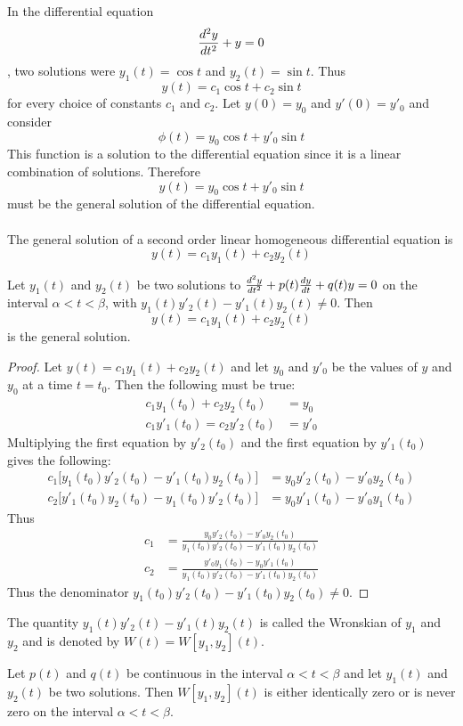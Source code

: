 \documentclass[12pt]{article}
\begin{document}
In the differential equation $$\frac{d^2y}{dt^2} + y = 0$$, two solutions were $y_1(t) = \cos t$ and $y_2(t) = \sin t$. Thus $$y(t) = c_1\cos t + c_2 \sin t $$ for every choice of constants $c_1$ and $c_2$. Let $y(0)= y_0$ and $y'(0) = y'_0$ and consider $$\phi(t) = y_0\cos t + y'_0 \sin t $$ This function is a solution to the differential equation since it is a linear combination of solutions. Therefore $$y(t) = y_0 \cos t + y'_0 \sin t $$ must be the general solution of the differential equation. \\~\\
The general solution of a second order linear homogeneous differential equation is $$ y(t) = c_1y_1(t) + c_2y_2(t) $$ 
\begin{theorem} Let $y_1(t)$ and $y_2(t)$ be two solutions to $\frac{d^2y}{dt^2} + p(t)\frac{dy}{dt} + q(t)y = 0$ on the interval $\alpha < t < \beta$, with $y_1(t)y'_2(t) - y'_1(t)y_2(t) \neq 0$. Then $$y(t) = c_1y_1(t) + c_2y_2(t)$$ is the general solution. \end{theorem} 
\begin{proof} Let $y(t) = c_1y_1(t) + c_2y_2(t)$ and let $y_0$ and $y'_0$ be the values of $y$ and $y_0$ at a time $t = t_0$. Then the following must be true: $$\begin{aligned} c_1y_1(t_0) + c_2y_2(t_0) &= y_0 \\ c_1y'_1(t_0) = c_2y'_2(t_0) &= y'_0 \end{aligned} $$ Multiplying the first equation by $y'_2(t_0)$ and the first equation by $y'_1(t_0)$ gives the following: $$\begin{aligned} c_1\Big[y_1(t_0)y'_2(t_0) - y'_1(t_0)y_2(t_0)\Big] &= y_0y'_2(t_0) - y'_0y_2(t_0) \\ c_2\Big[y'_1(t_0)y_2(t_0) - y_1(t_0)y'_2(t_0)\Big] &= y_0y'_1(t_0) - y'_0y_1(t_0) \end{aligned} $$ 
Thus $$\begin{aligned} c_1 &= \frac{y_0y'_2(t_0) - y'_0y_2(t_0)}{y_1(t_0)y'_2(t_0) - y'_1(t_0)y_2(t_0)} \\ 
c_2 &= \frac{y'_0y_1(t_0) - y_0y'_1(t_0)}{y_1(t_0)y'_2(t_0) - y'_1(t_0)y_2(t_0)} \end{aligned} $$ Thus the denominator $y_1(t_0)y'_2(t_0) - y'_1(t_0)y_2(t_0) \neq 0$. \end{proof} 
\begin{definition} The quantity $y_1(t)y'_2(t) - y'_1(t)y_2(t)$ is called the Wronskian of $y_1$ and $y_2$ and is denoted by $W(t) = W[y_1, y_2](t)$. \end{definition} 
\begin{theorem} Let $p(t)$ and $q(t)$ be continuous in the interval $\alpha < t < \beta$ and let $y_1(t)$ and $y_2(t)$ be two solutions. Then $W[y_1, y_2](t)$ is either identically zero or is never zero on the interval $\alpha < t < \beta$. \end{theorem} 
\end{document}
